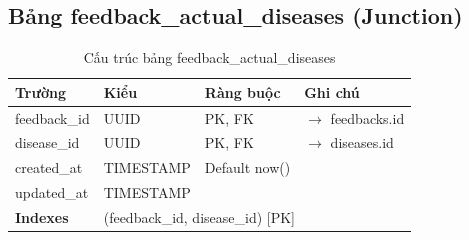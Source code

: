 \documentclass[12pt,a4paper]{article}
\begin{document}
\subsection{Bảng feedback\_actual\_diseases (Junction)}
\begin{longtable}{|l|l|l|p{5.5cm}|}
    \caption{Cấu trúc bảng feedback\_actual\_diseases}                                                                         \\
    \hline
    \rowcolor{headerblue}
    \textbf{Trường}  & \textbf{Kiểu}                                         & \textbf{Ràng buộc} & \textbf{Ghi chú}           \\
    \hline
    feedback\_id     & UUID                                                  & PK, FK             & $\rightarrow$ feedbacks.id \\
    \hline
    disease\_id      & UUID                                                  & PK, FK             & $\rightarrow$ diseases.id  \\
    \hline
    created\_at      & TIMESTAMP                                             & Default now()      &                            \\
    \hline
    updated\_at      & TIMESTAMP                                             &                    &                            \\
    \hline
    \rowcolor{headerblue}
    \textbf{Indexes} & \multicolumn{3}{l|}{(feedback\_id, disease\_id) [PK]}                                                   \\
    \hline
\end{longtable}
\end{document}
